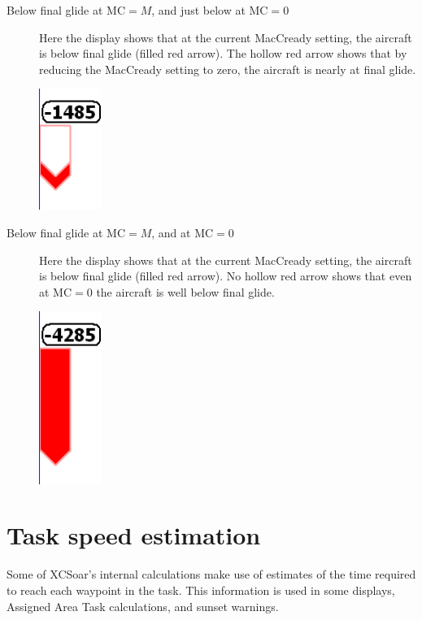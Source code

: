 \begin{description}
\item[Below final glide at MC$=M$, and just below at MC$=0$]
  Here the display shows that at the current MacCready setting, the aircraft
  is below final glide (filled red arrow).  The hollow red arrow
  shows that by reducing the MacCready setting to zero, the aircraft is
  nearly at final glide.
\begin{center}
\includegraphics[angle=0,width=2cm,keepaspectratio='true']{figures/fig-finalglide-littlebelow.png}
\end{center}

\item[Below final glide at MC$=M$, and at MC$=0$]
  Here the display shows that at the current MacCready setting, the aircraft
  is below final glide (filled red arrow).  No hollow red arrow
  shows that even at MC$=0$ the aircraft is well below final glide.
\begin{center}
\includegraphics[angle=0,width=2cm,keepaspectratio='true']{figures/fig-finalglide-allbelow.png}
\end{center}

\end{description}

\section{Task speed estimation}\label{sec:task-speed-estim}

Some of XCSoar's internal calculations make use of estimates of the
time required to reach each waypoint in the task.  This information is
used in some {\InfoBox} displays, Assigned Area Task calculations, and
sunset warnings.

